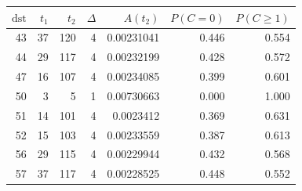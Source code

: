 \begin{tabular}{r r r r r r r}
\toprule
$\mathrm{dst}$ & $t_1$ & $t_2$ & $\Delta$ & $A(t_2)$ & $P(C=0)$ & $P(C\ge1)$ \\
\midrule
43 & 37 & 120 & 4 & 0.00231041 & 0.446 & 0.554 \\
44 & 29 & 117 & 4 & 0.00232199 & 0.428 & 0.572 \\
47 & 16 & 107 & 4 & 0.00234085 & 0.399 & 0.601 \\
50 & 3 & 5 & 1 & 0.00730663 & 0.000 & 1.000 \\
51 & 14 & 101 & 4 & 0.0023412 & 0.369 & 0.631 \\
52 & 15 & 103 & 4 & 0.00233559 & 0.387 & 0.613 \\
56 & 29 & 115 & 4 & 0.00229944 & 0.432 & 0.568 \\
57 & 37 & 117 & 4 & 0.00228525 & 0.448 & 0.552 \\
\bottomrule
\end{tabular}
